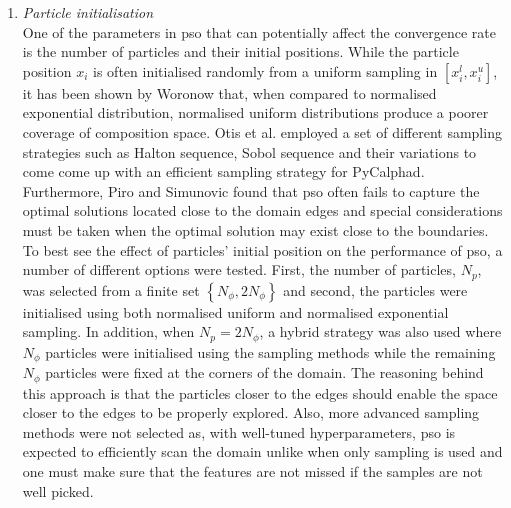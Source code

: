 \begin{enumerate}
		\item \emph{Particle initialisation}\\
			One of the parameters in \gls{pso} that can potentially affect the convergence rate is the number of particles and their initial positions. While the particle position $x_i$ is often initialised randomly from a uniform sampling in $\left[ x_i^l, x_i^u\right]$, it has been shown by Woronow \cite{Woronow:1993aa} that, when compared to normalised exponential distribution, normalised uniform distributions produce a poorer coverage of composition space. Otis et al. \cite{Otis:2017ab} employed a set of different sampling strategies such as Halton sequence, Sobol sequence and their variations to come come up with an efficient sampling strategy for PyCalphad. Furthermore, Piro and Simunovic \cite{Piro16} found that \gls{pso} often fails to capture the optimal solutions located close to the domain edges and special considerations must be taken when the optimal solution may exist close to the boundaries. To best see the effect of particles' initial position on the performance of \gls{pso}, a number of different options were tested. First, the number of particles, $N_p$, was selected from a finite set $\left\{ N_\phi, 2N_\phi\right\}$ and second, the particles were initialised using both normalised uniform and normalised exponential sampling. In addition, when $N_p = 2N_\phi$, a hybrid strategy was also used where $N_\phi$ particles were initialised using the sampling methods while the remaining $N_\phi$ particles were fixed at the corners of the domain. The reasoning behind this approach is that the particles closer to the edges should enable the space closer to the edges to be properly explored. Also, more advanced sampling methods were not selected as, with well-tuned hyperparameters, \gls{pso} is expected to efficiently scan the domain unlike when only sampling is used and one must make sure that the features are not missed if the samples are not well picked. 


\end{enumerate}
